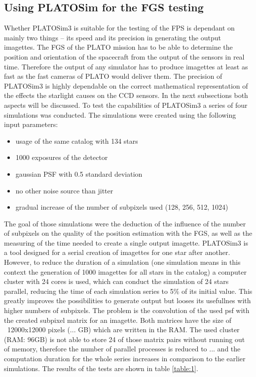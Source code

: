 \subsection{Using PLATOSim for the FGS testing}
Whether PLATOSim3 is suitable for the testing of the FPS is dependant on mainly two things -- its speed and its precision in generating the output imagettes. The FGS of the PLATO mission has to be able to determine the position and orientation of the spacecraft from the output of the sensors in real time. Therefore the output of any simulator has to produce imagettes at least as fast as the fast cameras of PLATO would deliver them. The precision of PLATOSim3 is highly dependable on the correct mathematical representation of the effects the starlight causes on the CCD sensors. In the next subsections both aspects will be discussed.
\newline
To test the capabilities of PLATOSim3 a series of four simulations was conducted. The simulations were created using the following input parameters:
\begin{itemize}
	\item usage of the same catalog with 134 stars
	\item 1000 exposures of the detector
	\item gaussian PSF with 0.5 standard deviation
	\item no other noise source than jitter
	\item gradual increase of the number of subpixels used (128, 256, 512, 1024)
\end{itemize}
The goal of those simulations were the deduction of the influence of the number of subpixels on the quality of the position estimation with the FGS, as well as the measuring of the time needed to create a single output imagette. 
\newline
PLATOSim3 is a tool designed for a serial creation of imagettes for one star after another. However, to reduce the duration of a simulation (one simulation means in this context the generation of 1000 imagettes for all stars in the catalog) a computer cluster with 24 cores is used, which can conduct the simulation of 24 stars parallel, reducing the time of each simulation series to 5\% of its initial value. This greatly improves the possibilities to generate output but looses its usefullnes with higher numbers of subpixels. The problem is the convolution of the used psf with the created subpixel matrix for an imagette. Both matrices have the size of ~12000x12000 pixels (... GB) which are written in the RAM. The used cluster (RAM: 96GB) is not able to store 24 of those matrix pairs without running out of memory, therefore the number of parallel processes is reduced to ... and the computation duration for the whole series increases in comparison to the earlier simulations. The results of the tests are shown in table \ref{table:1}. 
